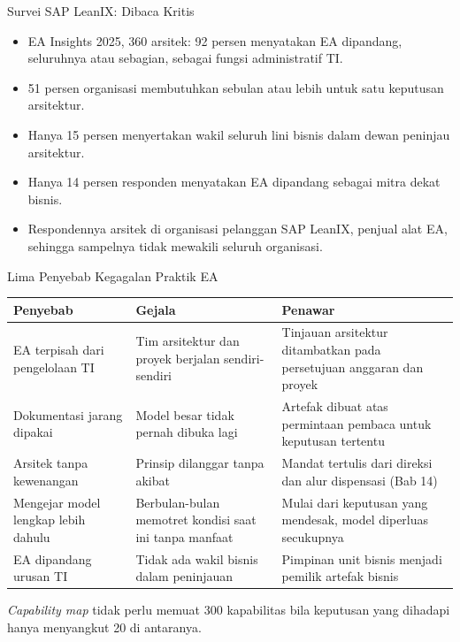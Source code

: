 \documentclass[aspectratio=169, table, 12pt]{beamer}
\begin{document}
\begin{frame}{{\Large Survei SAP LeanIX: Dibaca Kritis}}
  \vspace{6pt}
  \small
  \begin{itemize}
    \item EA Insights 2025, 360 arsitek: 92 persen menyatakan EA dipandang, seluruhnya atau sebagian,
          sebagai fungsi administratif TI.
    \item 51 persen organisasi membutuhkan sebulan atau lebih untuk satu keputusan arsitektur.
    \item Hanya 15 persen menyertakan wakil seluruh lini bisnis dalam dewan peninjau arsitektur.
    \item Hanya 14 persen responden menyatakan EA dipandang sebagai mitra dekat bisnis.
    \item Respondennya arsitek di organisasi pelanggan SAP LeanIX, penjual alat EA, sehingga sampelnya
          tidak mewakili seluruh organisasi.
  \end{itemize}
\end{frame}

\begin{frame}{{\Large Lima Penyebab Kegagalan Praktik EA}}
  \scriptsize
  \begin{tabularx}{\textwidth}{>{\raggedright\arraybackslash}p{3.3cm}
      >{\raggedright\arraybackslash}X >{\raggedright\arraybackslash}X}
    \hline
    \textbf{Penyebab} & \textbf{Gejala} & \textbf{Penawar} \\
    \hline
    EA terpisah dari pengelolaan TI & Tim arsitektur dan proyek berjalan sendiri-sendiri & Tinjauan arsitektur ditambatkan pada persetujuan anggaran dan proyek \\
    \hline
    Dokumentasi jarang dipakai & Model besar tidak pernah dibuka lagi & Artefak dibuat atas permintaan pembaca untuk keputusan tertentu \\
    \hline
    Arsitek tanpa kewenangan & Prinsip dilanggar tanpa akibat & Mandat tertulis dari direksi dan alur dispensasi (Bab 14) \\
    \hline
    Mengejar model lengkap lebih dahulu & Berbulan-bulan memotret kondisi saat ini tanpa manfaat & Mulai dari keputusan yang mendesak, model diperluas secukupnya \\
    \hline
    EA dipandang urusan TI & Tidak ada wakil bisnis dalam peninjauan & Pimpinan unit bisnis menjadi pemilik artefak bisnis \\
    \hline
  \end{tabularx}

  \vspace{6pt}
  \small \textit{Capability map} tidak perlu memuat 300 kapabilitas bila keputusan yang dihadapi hanya
  menyangkut 20 di antaranya.
\end{frame}
\end{document}
